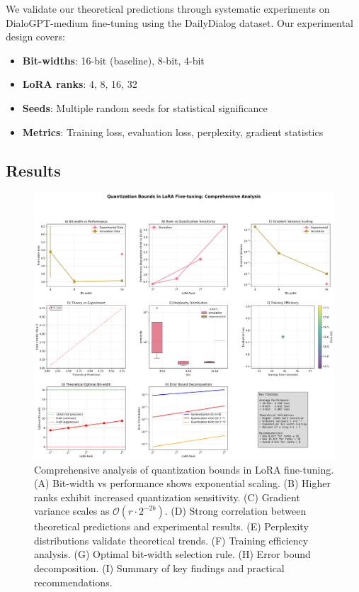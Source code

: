\documentclass[10pt,twocolumn]{article}
\begin{document}
We validate our theoretical predictions through systematic experiments on DialoGPT-medium fine-tuning using the DailyDialog dataset. Our experimental design covers:

\begin{itemize}
\item \textbf{Bit-widths}: 16-bit (baseline), 8-bit, 4-bit
\item \textbf{LoRA ranks}: 4, 8, 16, 32
\item \textbf{Seeds}: Multiple random seeds for statistical significance
\item \textbf{Metrics}: Training loss, evaluation loss, perplexity, gradient statistics
\end{itemize}

\subsection{Results}

\begin{figure}[t]
\centering
\includegraphics[width=\columnwidth]{figures/comprehensive_analysis.png}
\caption{Comprehensive analysis of quantization bounds in LoRA fine-tuning. (A) Bit-width vs performance shows exponential scaling. (B) Higher ranks exhibit increased quantization sensitivity. (C) Gradient variance scales as $\mathcal{O}(r \cdot 2^{-2b})$. (D) Strong correlation between theoretical predictions and experimental results. (E) Perplexity distributions validate theoretical trends. (F) Training efficiency analysis. (G) Optimal bit-width selection rule. (H) Error bound decomposition. (I) Summary of key findings and practical recommendations.}
\label{fig:comprehensive}
\end{figure}
\end{document}
